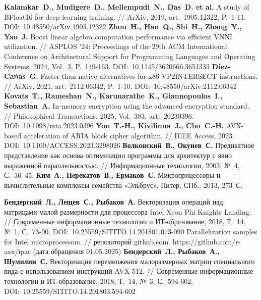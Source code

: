 \begin{thebibliography}{99}
\textbf{Kalamkar~D., Mudigere~D., Mellempudi~N., Das~D. et al.} A study of BFloat16 for deep learning training. // ArXiv, 2019, art.~1905.12322, P.~1-11. DOI:~10.48550/arXiv.1905.12322
\textbf{Zhou~H., Han~Q., Shi~H., Zhang~Y., Yao~J.} Boost linear algebra computation performance via efficient VNNI utilization. // ASPLOS '24: Proceedings of the 29th ACM International Conference on Architectural Support for Programming Languages and Operating Systems, 2024, Vol.~3, P.~149-163. DOI:~10.1145/3620666.3651333
\textbf{D{\'i}ez-Ca{\~n}as~G.} Faster-than-native alternatives for x86 VP2INTERSECT instructions. // ArXiv, 2021, art.~2112.06342, P.~1-10. DOI:~10.48550/arXiv.2112.06342
\textbf{Kovats~T., Rameshan~N., Karunarathe~K., Giannopoulos~I., Sebastian~A.} In-memory encryption using the advanced encryption standard. // Philosophical Transactions, 2025, Vol.~383, art.~20230396. DOI:~10.1098/rsta.2023.0396
\textbf{Yoo~T.-H., Kivilinna~J., Cho~C.-H.} AVX-based acceleration of ARIA block cipher algorithm. // IEEE Access, 2023. DOI:~10.1109/ACCESS.2023.3298026
\textbf{Волконский~В., Окунев~С.} Предикатное представление как основа оптимизации программы для архитектур с явно выраженной параллельностью. // Информационные технологии, 2003, №~4, С.~36–45.
\textbf{Ким~А., Перекатов~В., Ермаков~С.} Микропроцессоры и вычислительные комплексы семейства «Эльбрус», Питер, СПб., 2013, 273~С.

\textbf{Бендерский~Л., Лещев~С., Рыбаков~А.} Векторизация операций над матрицами малой размерности для процессора Intel Xeon Phi Knights Landing. // Современные информационные технологии и ИТ-образование, 2018, Т.~14, №~1, С.~73-90. DOI:~10.25559/SITITO.14.201801.073-090
Parallelization samples for Intel microprocessors. // репозиторий github.com. https://github.com/r-aax/ipar (дата обращения 01.05.2025)
\textbf{Бендерский~Л., Рыбаков~А., Шумилин~С.} Векторизация перемножения малоразмерных матриц специального вида с использованием инструкций AVX-512. // Современные информационные технологии и ИТ-образование, 2018, Т.~14, №~3, С.~594-602. DOI:~10.25559/SITITO.14.201803.594-602


\end{thebibliography}
